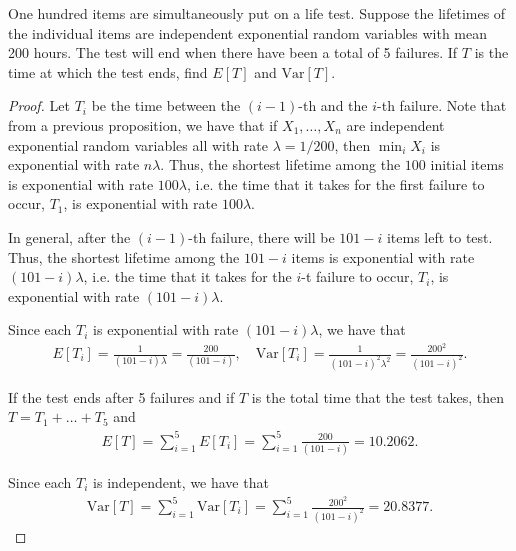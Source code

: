 \begin{problem}{5.15}
  One hundred items are simultaneously put on a life test. Suppose the lifetimes of the
  individual items are independent exponential random variables with mean 200 hours.
  The test will end when there have been a total of 5 failures. If $T$ is the time at which the test
  ends, find $E[T]$ and $\text{Var}[T]$.
\end{problem}

\begin{proof}
  Let $T_i$ be the time between the $(i-1)$-th and the $i$-th failure.
  Note that from a previous proposition, we have that if $X_1, \dots, X_n$
  are independent exponential random variables all with rate $\lambda = 1/200$,
  then $\min_i X_i$ is exponential with rate $n \lambda$. Thus, the shortest lifetime
  among the $100$ initial items is exponential with rate $100 \lambda$, i.e. the time that
  it takes for the first failure to occur, $T_1$, is exponential with rate $100\lambda$.

  In general, after the $(i-1)$-th failure, there will be $101 - i$ items left to test. Thus,
  the shortest lifetime among the $101 - i$ items is exponential with rate $(101 - i) \lambda$, i.e. the time that
  it takes for the $i$-t failure to occur, $T_i$, is exponential with rate $(101-i)\lambda$.

  Since each $T_i$ is exponential with rate $(101-i)\lambda$, we have that
  \begin{align*}
    E[T_i] = \frac{1}{(101-i)\lambda} = \frac{200}{(101-i)}, \quad \text{Var}[T_i] = \frac{1}{(101-i)^2\lambda^2} = \frac{200^2}{(101-i)^2}.
  \end{align*}

  If the test ends after 5 failures and if $T$ is the total time that the test takes,
  then $T = T_1 +\dots + T_5$ and
  \begin{align*}
    E[T] = \sum_{i=1}^5 E[T_i] = \sum_{i=1}^5 \frac{200}{(101-i)} = 10.2062.
  \end{align*}

  Since each $T_i$ is independent, we have that
  \begin{align*}
    \text{Var}[T] = \sum_{i=1}^5  \text{Var}[T_i] = \sum_{i=1}^5 \frac{200^2}{(101-i)^2} = 20.8377.
  \end{align*}
\end{proof}
\newpage

